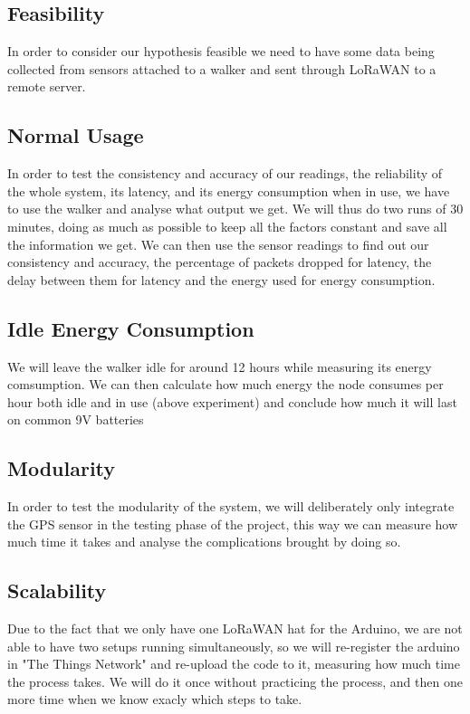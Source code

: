	\subsection{Feasibility}
		In order to consider our hypothesis feasible we need to have some data being collected from sensors attached to a walker and sent through LoRaWAN to a remote server.

	\subsection{Normal Usage}
		In order to test the consistency and accuracy of our readings, the reliability of the whole system, its latency, and its energy consumption when in use, we have to use the walker and analyse what output we get. We will thus do two runs of 30 minutes, doing as much as possible to keep all the factors constant and save all the information we get. We can then use the sensor readings to find out our consistency and accuracy, the percentage of packets dropped for latency, the delay between them for latency and the energy used for energy consumption.

	\subsection{Idle Energy Consumption}
		We will leave the walker idle for around 12 hours while measuring its energy comsumption.
		We can then calculate how much energy the node consumes per hour both idle and in use (above experiment) and conclude how much it will last on common 9V batteries

	\subsection{Modularity}
		In order to test the modularity of the system, we will deliberately only integrate the GPS sensor in the testing phase of the project, this way we can measure how much time it takes and analyse the complications brought by doing so.

	\subsection{Scalability}
		Due to the fact that we only have one LoRaWAN hat for the Arduino, we are not able to have two setups running simultaneously, so we will re-register the arduino in "The Things Network" and re-upload the code to it, measuring how much time the process takes. We will do it once without practicing the process, and then one more time when we know exacly which steps to take.

